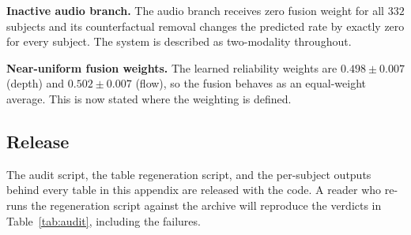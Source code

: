 \textbf{Inactive audio branch.} The audio branch receives zero fusion weight for all $332$ subjects and
its counterfactual removal changes the predicted rate by exactly zero for every subject. The system is
described as two-modality throughout.

\textbf{Near-uniform fusion weights.} The learned reliability weights are $0.498{\pm}0.007$ (depth) and
$0.502{\pm}0.007$ (flow), so the fusion behaves as an equal-weight average. This is now stated where the
weighting is defined.

\subsection{Release}
The audit script, the table regeneration script, and the per-subject outputs behind every table in this
appendix are released with the code. A reader who re-runs the regeneration script against the archive
will reproduce the verdicts in Table~\ref{tab:audit}, including the failures.

